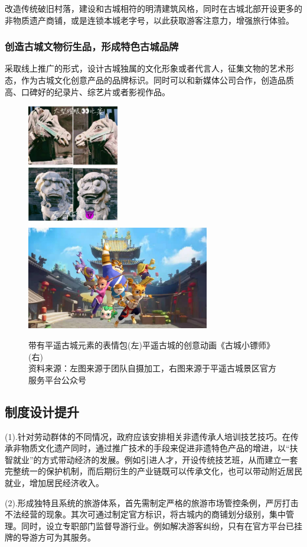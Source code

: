 \documentclass[UTF8]{ctexart}
\begin{document}
改造传统破旧村落，建设和古城相符的明清建筑风格，同时在古城北部开设更多的非物质遗产商铺，或是连锁本城老字号，以此获取游客注意力，增强旅行体验。
        \subsubsection{创造古城文物衍生品，形成特色古城品牌}
采取线上推广的形式，设计古城独属的文化形象或者代言人，征集文物的艺术形态，作为古城文化创意产品的品牌标识。同时可以和新媒体公司合作，创造品质高、口碑好的纪录片、综艺片或者影视作品。
\begin{figure}[H]
    \centering
    \includegraphics[width=4cm]{表情包.jpg}
    \includegraphics[width=8cm]{古城小镖师.jpg}
    \caption[plain]{带有平遥古城元素的表情包(左)平遥古城的创意动画《古城小镖师》(右)\\资料来源：左图来源于团队自摄加工，右图来源于平遥古城景区官方服务平台公众号}
    \label{fig:my_label}
\end{figure}
    \subsection{制度设计提升}
(1).针对劳动群体的不同情况，政府应该安排相关非遗传承人培训技艺技巧。在传承非物质文化遗产同时，通过推广技术的手段来促进非遗特色产品的增进，以“扶智就业”的方式带动经济的发展。例如引进人才，开设传统技艺班，从而建立一套完整统一的保护机制，而后期衍生的产业链既可以传承文化，也可以带动附近居民就业，增加居民经济收入。


(2).形成独特且系统的旅游体系，首先需制定严格的旅游市场管控条例，严厉打击不法经营的现象。其次可通过制定官方标识，将古城内的商铺划分级别，集中管理。同时，设立专职部门监督导游行业。例如解决游客纠纷，只有在官方平台已挂牌的导游方可为其服务。
\end{document}
